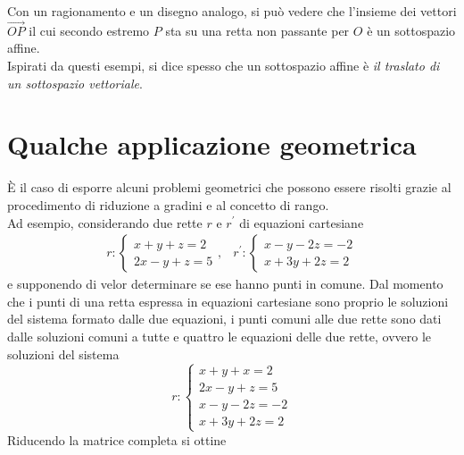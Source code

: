 Con un ragionamento e un disegno analogo, si può vedere che l'insieme dei vettori $\vec{OP}$ il cui
secondo estremo $P$ sta su una retta non passante per $O$ è un sottospazio affine.\\
Ispirati da questi esempi, si dice spesso che un sottospazio affine è \textit{il traslato di un
  sottospazio vettoriale}.

\section{Qualche applicazione geometrica}
\label{sec:qualcheappgeo}

È il caso di esporre alcuni problemi geometrici che possono essere risolti grazie al procedimento
di riduzione a gradini e al concetto di rango.\\
Ad esempio, considerando due rette $r$ e $r^\prime$ di equazioni cartesiane
\begin{eqnarray}
  \label{eq:qualcheappgeo1}
  r:
  \begin{cases}
    x+y+z=2\\
    2x-y+z=5
  \end{cases}, & r^\prime:
  \begin{cases}
    x-y-2z=-2\\
    x+3y+2z=2
  \end{cases}
\end{eqnarray}
e supponendo di velor determinare se ese hanno punti in comune. Dal momento che i punti di una retta
espressa in equazioni cartesiane sono proprio le soluzioni del sistema formato dalle due equazioni,
i punti comuni alle due rette sono dati dalle soluzioni comuni a tutte e quattro le equazioni delle
due rette, ovvero le soluzioni del sistema
\begin{equation}
  \label{eq:qualcheappgeo2}
  r:
  \begin{cases}
    x+y+x=2\\
    2x-y+z=5\\
    x-y-2z=-2\\
    x+3y+2z=2
  \end{cases}
\end{equation}
Riducendo la matrice completa si ottine

